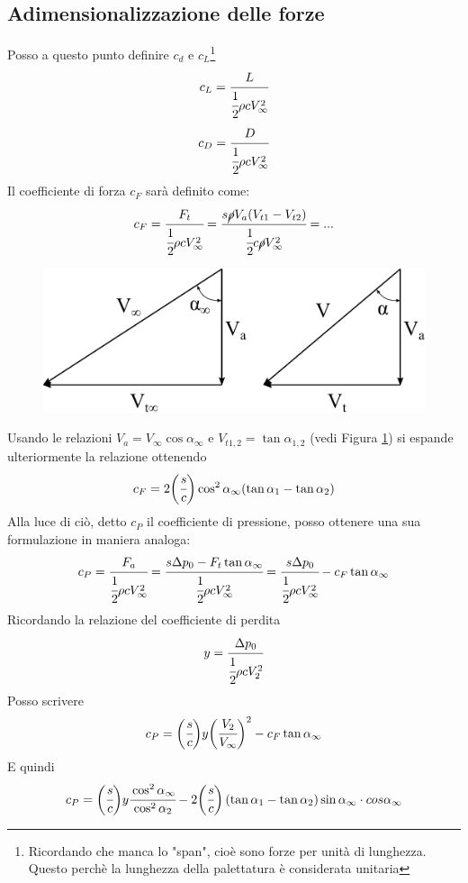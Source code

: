 \subsection{Adimensionalizzazione delle forze}
Posso a questo punto definire $c_d$ e $c_L$\footnote{Ricordando che manca lo "span", cioè sono forze per unità di lunghezza. Questo perchè la lunghezza della palettatura è considerata unitaria
}
\begin{align*}
c_L = \cfrac{L}{\cfrac{1}{2} \rho c V_{\infty}^2}
\end{align*}
\begin{align*}
c_D = \cfrac{D}{\cfrac{1}{2} \rho c V_{\infty}^2}
\end{align*}
Il coefficiente di forza $c_F$ sarà definito come:
\begin{align*}
c_F = \cfrac{F_t}{\cfrac{1}{2} \rho c V_{\infty}^2} = \cfrac{s \cancel{\rho} V_a (V_{t1}-V_{t2})}{\cfrac{1}{2} c \cancel{\rho} V_{\infty}^2} = ...
\end{align*}
\begin{figure}
\centering
  \includegraphics[width=.6\textwidth]{fig/trigrel.pdf}
\caption{}
\label{fig:trigrel}
\end{figure}
Usando le relazioni $V_a = V_{\infty} \cos \alpha_{\infty}$ e $V_{t1,2} = \tan \alpha_{1,2}$ (vedi Figura \ref{fig:trigrel}) si espande ulteriormente la relazione ottenendo
\begin{equation}
c_F = 2 \bigg(\cfrac{s}{c} \bigg) \cos ^ 2 \alpha_{\infty}(\tan \alpha_1 - \tan \alpha_2)
\end{equation}
Alla luce di ciò, detto $c_P$ il coefficiente di pressione, posso ottenere una sua formulazione in maniera analoga:
\begin{align*}
c_P = \cfrac{F_a}{\cfrac{1}{2} \rho c V_{\infty}^2} = \cfrac{s \Delta p_0 - F_t \tan \alpha_{\infty}}{\cfrac{1}{2} \rho c V_{\infty}^2} = \cfrac{s \Delta p_0}{\cfrac{1}{2} \rho c V_{\infty}^2} - c_F \tan \alpha_{\infty}
\end{align*}
Ricordando la relazione del coefficiente di perdita
\begin{align*}
y = \cfrac{\Delta p_0}{\cfrac{1}{2} \rho c V_2^2}
\end{align*}
Posso scrivere
\begin{align*}
c_P = \bigg(\cfrac{s}{c}\bigg)y \bigg(\cfrac{V_2}{V_{\infty}}\bigg)^2 - c_F \tan \alpha_{\infty}
\end{align*}
E quindi
\begin{align*}
c_P = \bigg(\cfrac{s}{c}\bigg)y \cfrac{\cos^2 \alpha_{\infty}}{\cos^2 \alpha_2} -2\bigg(\cfrac{s}{c}\bigg) \left(\tan \alpha_1 - \tan \alpha_2 \right) \sin \alpha_{\infty} \cdot cos \alpha_{\infty}
\end{align*}

